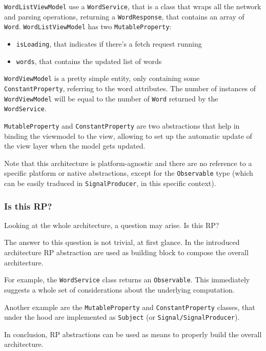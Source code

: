 \texttt{WordListViewModel} use a \texttt{WordService}, that is a class
that wraps all the network and parsing operations, returning a
\texttt{WordResponse}, that contains an array of \texttt{Word}.
\texttt{WordListViewModel} has two \texttt{MutableProperty}:

\begin{itemize}
\itemsep1pt\parskip0pt
\item
  \texttt{isLoading}, that indicates if there's a fetch request running
\item
  \texttt{words}, that contains the updated list of words
\end{itemize}

\texttt{WordViewModel} is a pretty simple entity, only containing some
\texttt{ConstantProperty}, referring to the word attributes. The number
of instances of \texttt{WordViewModel} will be equal to the number of
\texttt{Word} returned by the \texttt{WordService}.

\texttt{MutableProperty} and \texttt{ConstantProperty} are two
abstractions that help in binding the viewmodel to the view, allowing to
set up the automatic update of the view layer when the model gets
updated.

Note that this architecture is platform-agnostic and there are no
reference to a specific platform or native abstractions, except for the
\texttt{Observable} type (which can be easily traduced in
\texttt{SignalProducer}, in this specific context).

\subsubsection{Is this RP?}\label{is-this-rp}

Looking at the whole architecture, a question may arise. Is this RP?

The answer to this question is not trivial, at first glance. In the
introduced architecture RP abstraction are used as building block to
compose the overall architecture.

For example, the \texttt{WordService} class returns an
\texttt{Observable}. This immediately suggests a whole set of
considerations about the underlying computation.

Another example are the \texttt{MutableProperty} and
\texttt{ConstantProperty} classes, that under the hood are implemented
as \texttt{Subject} (or \texttt{Signal/SignalProducer}).

In conclusion, RP abstractions can be used as means to properly build
the overall architecture.


